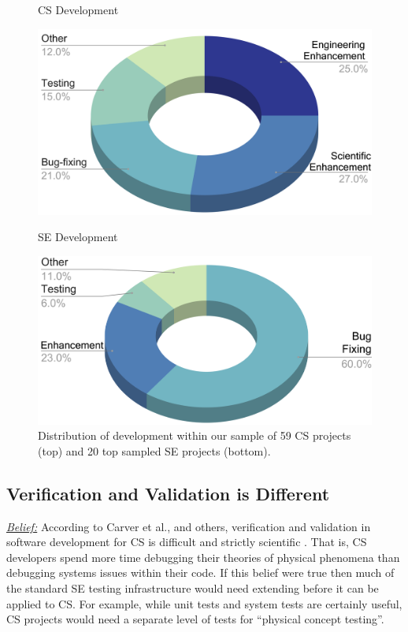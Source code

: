 \documentclass[sigconf,review,anonymous]{acmart}
\begin{document}
\begin{figure}[!b]

\begin{center}
CS Development 
 

 \includegraphics[width=.4\textwidth]{img/CS_commits_1.png}

 SE Development

 
\includegraphics[width=.45\textwidth]{img/SE_commits_1.png}
 
\end{center}
\caption{Distribution of development within our sample of 59 CS projects (top) and 20 top sampled SE projects (bottom).}
\label{fig:SE_activities}
\end{figure}





\subsection{Verification and Validation is Different}\label{vv}
\textit{\underline{Belief:}} 
According to Carver et al., and others, 
verification and validation in software development for CS is difficult and strictly scientific \cite{carver07_environment, kanewala13_testing, carver06_hpc, Prabhu11_cssurvey, basili08_hpc}.
That is, CS developers spend more time debugging their theories
of physical phenomena than debugging systems issues within their code.
If this belief were true then much of the standard SE testing
infrastructure would need extending before it can be applied to CS. For example,
while unit tests and system tests are certainly useful, CS projects would need a separate level of tests for ``physical concept testing''. 
\end{document}
